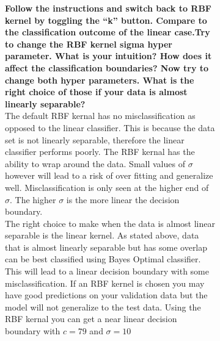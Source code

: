 \documentclass[11pt,oneside,a4paper]{article}
\begin{document}
 \begin{figure}[H]
 	\centering
 	\begin{subfigure}[b]{.5\textwidth}
 	
 		\textbf{Follow the instructions and switch back to RBF kernel by toggling the “k” button. Compare to the classification outcome of the linear case.Try to change the RBF kernel sigma hyper parameter. What is your intuition? How does it affect the classification boundaries? Now try to change both hyper parameters. What is the right choice of those if your data is almost linearly separable?}\\
 		
		 The default RBF kernal has no misclassification as opposed to the linear classifier. This is because the data set is not linearly separable, therefore the linear classifier performs poorly. The RBF kernal has the ability to wrap around the data. Small values of  $\sigma$ however will lead to a risk of over fitting and generalize well. Misclassification is only seen at the higher end of  $\sigma$. The higher  $\sigma$  is the more linear the decision boundary. \\
		 
		 The right choice to make when the data is almost linear separable is the linear kernel. As stated above, data that is almost linearly separable but has some overlap can be best classified using Bayes Optimal classifier. This will lead to a linear decision boundary with some misclassification. If an RBF kernel is chosen you may have good predictions on your validation data but the model will not generalize to the test data. Using the RBF kernal you can get a near linear decision boundary with $ c = 79$ and $\sigma = 10$
		 
 		
 	

\end{subfigure}
\end{figure}
\end{document}
